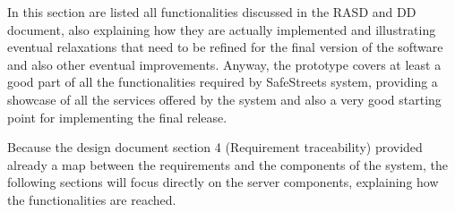 In this section are listed all functionalities discussed in the RASD and DD document, also explaining how they are actually implemented and illustrating eventual relaxations that need to be refined for the final version of the software and also other eventual improvements. Anyway, the prototype covers at least a good part of all the functionalities required by SafeStreets system, providing a showcase of all the services offered by the system and also a very good starting point for implementing the final release.

Because the design document section 4 (Requirement traceability) provided already a map between the requirements and the components of the system, the following sections will focus directly on the server components, explaining how the functionalities are reached.